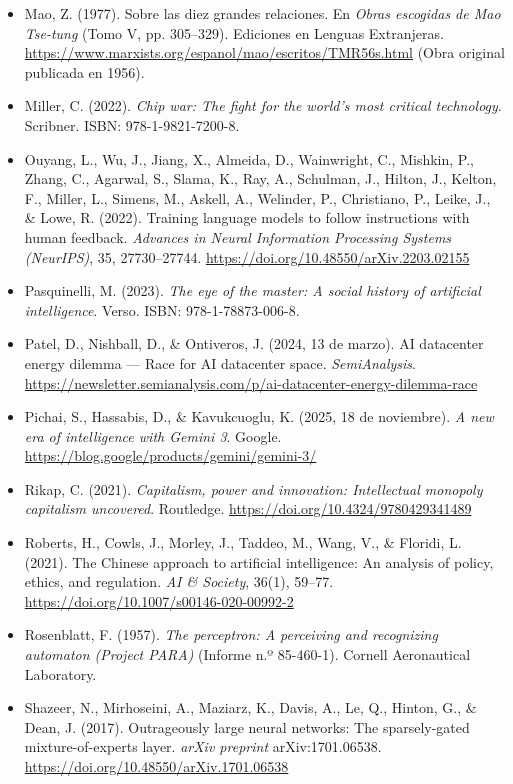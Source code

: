 \begin{itemize}[leftmargin=1.5em, label={}, itemsep=0.22ex, parsep=0pt]
    \item Mao, Z. (1977). Sobre las diez grandes relaciones. En \textit{Obras escogidas de Mao Tse-tung} (Tomo V, pp. 305--329). Ediciones en Lenguas Extranjeras. \url{https://www.marxists.org/espanol/mao/escritos/TMR56s.html} (Obra original publicada en 1956).
    \item Miller, C. (2022). \textit{Chip war: The fight for the world's most critical technology}. Scribner. ISBN: 978-1-9821-7200-8.
    \item Ouyang, L., Wu, J., Jiang, X., Almeida, D., Wainwright, C., Mishkin, P., Zhang, C., Agarwal, S., Slama, K., Ray, A., Schulman, J., Hilton, J., Kelton, F., Miller, L., Simens, M., Askell, A., Welinder, P., Christiano, P., Leike, J., \& Lowe, R. (2022). Training language models to follow instructions with human feedback. \textit{Advances in Neural Information Processing Systems (NeurIPS)}, 35, 27730--27744. \url{https://doi.org/10.48550/arXiv.2203.02155}
    \item Pasquinelli, M. (2023). \textit{The eye of the master: A social history of artificial intelligence}. Verso. ISBN: 978-1-78873-006-8.
    \item Patel, D., Nishball, D., \& Ontiveros, J. (2024, 13 de marzo). AI datacenter energy dilemma --- Race for AI datacenter space. \textit{SemiAnalysis}. \url{https://newsletter.semianalysis.com/p/ai-datacenter-energy-dilemma-race}
    \item Pichai, S., Hassabis, D., \& Kavukcuoglu, K. (2025, 18 de noviembre). \textit{A new era of intelligence with Gemini 3}. Google. \url{https://blog.google/products/gemini/gemini-3/}
    \item Rikap, C. (2021). \textit{Capitalism, power and innovation: Intellectual monopoly capitalism uncovered}. Routledge. \url{https://doi.org/10.4324/9780429341489}
    \item Roberts, H., Cowls, J., Morley, J., Taddeo, M., Wang, V., \& Floridi, L. (2021). The Chinese approach to artificial intelligence: An analysis of policy, ethics, and regulation. \textit{AI \& Society}, 36(1), 59--77. \url{https://doi.org/10.1007/s00146-020-00992-2}
    \item Rosenblatt, F. (1957). \textit{The perceptron: A perceiving and recognizing automaton (Project PARA)} (Informe n.º 85-460-1). Cornell Aeronautical Laboratory.
    \item Shazeer, N., Mirhoseini, A., Maziarz, K., Davis, A., Le, Q., Hinton, G., \& Dean, J. (2017). Outrageously large neural networks: The sparsely-gated mixture-of-experts layer. \textit{arXiv preprint} arXiv:1701.06538. \url{https://doi.org/10.48550/arXiv.1701.06538}

\end{itemize}
